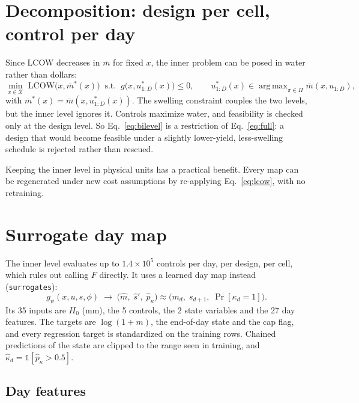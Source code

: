 \documentclass[11pt]{article}
\newcommand{\code}[1]{\texttt{#1}}
\DeclareMathOperator*{\argmax}{arg\,max}
\begin{document}
\section{Decomposition: design per cell, control per day}
\label{sec:decomp}

Since LCOW decreases in $\bar m$ for fixed $x$, the inner problem can be posed in water
rather than dollars:
\begin{equation}
\min_{x \in \mathcal{X}} \; \mathrm{LCOW}\bigl(x, \bar m^\ast(x)\bigr)
\;\;\text{s.t.}\;\; g\bigl(x, u^\ast_{1:D}(x)\bigr) \le 0,
\qquad
u^\ast_{1:D}(x) \in \argmax_{\pi \in \Pi} \bar m(x, u_{1:D}),
\label{eq:bilevel}
\end{equation}
with $\bar m^\ast(x) = \bar m(x, u^\ast_{1:D}(x))$. The swelling constraint couples the two
levels, but the inner level ignores it. Controls maximize water, and feasibility is checked
only at the design level. So Eq.~\eqref{eq:bilevel} is a restriction of
Eq.~\eqref{eq:full}: a design that would become feasible under a slightly lower-yield,
less-swelling schedule is rejected rather than rescued.

Keeping the inner level in physical units has a practical benefit. Every map can be
regenerated under new cost assumptions by re-applying Eq.~\eqref{eq:lcow}, with no
retraining.

\section{Surrogate day map}
\label{sec:surrogate}

The inner level evaluates up to $1.4\times10^5$ controls per day, per design, per cell,
which rules out calling $F$ directly. It uses a learned day map instead
(\code{surrogates}):
\begin{equation}
g_\psi(x, u, s, \phi) \;\to\; \bigl(\hat m,\; \hat s',\; \hat p_\kappa\bigr) \approx
\bigl(m_d,\; s_{d+1},\; \Pr[\kappa_d = 1]\bigr).
\end{equation}
Its 35 inputs are $H_0$ (mm), the 5 controls, the 2 state variables and the 27 day
features. The targets are $\log(1+m)$, the end-of-day state and the cap flag, and every
regression target is standardized on the training rows. Chained predictions of the state are
clipped to the range seen in training, and $\hat\kappa_d = \mathbb{1}[\hat p_\kappa > 0.5]$.

\subsection{Day features}
\label{sec:features}
\end{document}
